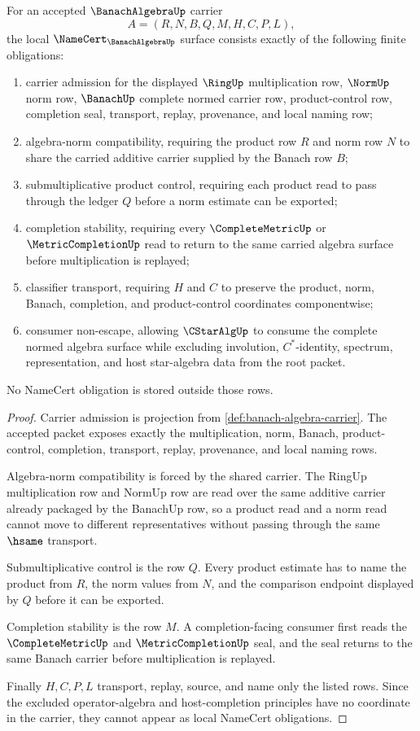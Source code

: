 \begin{theorem}
\label{thm:banach-algebra-namecert-obligations}
For an accepted $\BanachAlgebraUp$ carrier
$$
A=(R,N,B,Q,M,H,C,P,L),
$$
the local $\NameCert_{\BanachAlgebraUp}$ surface consists exactly of the following finite obligations:
\begin{enumerate}
\item carrier admission for the displayed $\RingUp$ multiplication row, $\NormUp$ norm row, $\BanachUp$ complete normed carrier row, product-control row, completion seal, transport, replay, provenance, and local naming row;
\item algebra-norm compatibility, requiring the product row $R$ and norm row $N$ to share the carried additive carrier supplied by the Banach row $B$;
\item submultiplicative product control, requiring each product read to pass through the ledger $Q$ before a norm estimate can be exported;
\item completion stability, requiring every $\CompleteMetricUp$ or $\MetricCompletionUp$ read to return to the same carried algebra surface before multiplication is replayed;
\item classifier transport, requiring $H$ and $C$ to preserve the product, norm, Banach, completion, and product-control coordinates componentwise;
\item consumer non-escape, allowing $\CStarAlgUp$ to consume the complete normed algebra surface while excluding involution, $C^*$-identity, spectrum, representation, and host star-algebra data from the root packet.
\end{enumerate}
No NameCert obligation is stored outside those rows.
\end{theorem}
\begin{proof}
Carrier admission is projection from \autoref{def:banach-algebra-carrier}. The accepted packet exposes exactly the multiplication, norm, Banach, product-control, completion, transport, replay, provenance, and local naming rows.

Algebra-norm compatibility is forced by the shared carrier. The RingUp multiplication row and NormUp row are read over the same additive carrier already packaged by the BanachUp row, so a product read and a norm read cannot move to different representatives without passing through the same $\hsame$ transport.

Submultiplicative control is the row $Q$. Every product estimate has to name the product from $R$, the norm values from $N$, and the comparison endpoint displayed by $Q$ before it can be exported.

Completion stability is the row $M$. A completion-facing consumer first reads the $\CompleteMetricUp$ and $\MetricCompletionUp$ seal, and the seal returns to the same Banach carrier before multiplication is replayed.

Finally $H,C,P,L$ transport, replay, source, and name only the listed rows. Since the excluded operator-algebra and host-completion principles have no coordinate in the carrier, they cannot appear as local NameCert obligations.
\end{proof}

